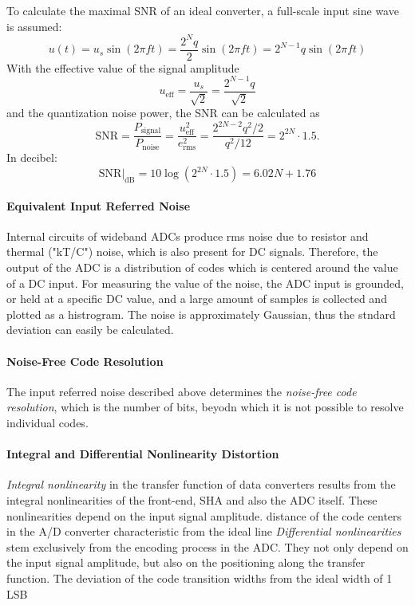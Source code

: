 To calculate the maximal SNR of an ideal converter, a full-scale input sine wave is assumed:
\begin{equation}
	u(t) = u_s \sin(2\pi f t) = \frac{2^{N}q}{2}\sin(2\pi f t)  = 2^{N-1}q \sin(2\pi f t)
\end{equation}
With the effective value of the signal amplitude
\begin{equation}
	u_{\text{eff}} = \frac{u_s}{\sqrt{2}} = \frac{2^{N-1}q}{\sqrt{2}}
\end{equation}
and the quantization noise power, the SNR can be calculated as
\begin{equation}
	\text{SNR} = \frac{P_{\text{signal}}}{P_{\text{noise}}} = \frac{u_{\text{eff}}^{2}}{e_{\text{rms}}^{2}} = \frac{2^{2N-2}q^2/2}{q^2/12} = 2^{2N} \cdot 1.5.
\end{equation}
In decibel:
\begin{equation}
	\text{SNR}|_{\text{dB}} = 10\log\left(2^{2N}\cdot 1.5\right) = 6.02 N + 1.76
\end{equation}
\cite{puente2015} \cite{walt}

\paragraph{Equivalent Input Referred Noise}
Internal circuits of wideband ADCs produce rms noise due to resistor and thermal ("kT/C") noise, which is also present for DC signals. Therefore, the output of the ADC is a distribution of codes which is centered around the value of a DC input. For measuring the value of the noise, the ADC input is grounded, or held at a specific DC value, and a large amount of samples is collected and plotted as a histrogram. The noise is approximately Gaussian, thus the stndard deviation can easily be calculated.

\paragraph{Noise-Free Code Resolution}
The input referred noise described above determines the \textit{noise-free code resolution}, which is the number of bits, beyodn which it is not possible to resolve individual codes.

\paragraph{Integral and Differential Nonlinearity Distortion} 
\textit{Integral nonlinearity} in the transfer function of data converters results from the integral nonlinearities of the front-end, SHA and also the ADC itself. These nonlinearities depend on the input signal amplitude. distance of the code centers in the A/D converter characteristic from the ideal line
\textit{Differential nonlinearities} stem exclusively from the encoding process in the ADC. They not only depend on the input signal amplitude, but also on the positioning along the transfer function. The deviation of the code transition widths from the ideal width
of 1 LSB

